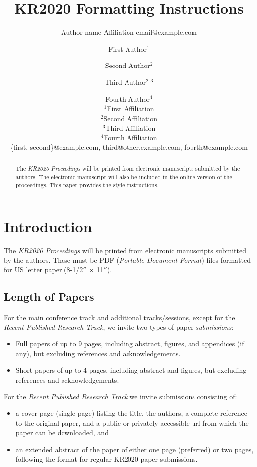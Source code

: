 \documentclass{article}
\title{KR2020 Formatting Instructions}
\author{%
    Author name
    \affiliations
    Affiliation
    \emails
    email@example.com    %
}
\author{%
First Author$^1$\and
Second Author$^2$\and
Third Author$^{2,3}$\and
Fourth Author$^4$ \\
\affiliations
$^1$First Affiliation\\
$^2$Second Affiliation\\
$^3$Third Affiliation\\
$^4$Fourth Affiliation \\
\emails
\{first, second\}@example.com,
third@other.example.com,
fourth@example.com
}
\begin{document}
\maketitle

\begin{abstract}
  The \textit{KR2020 Proceedings} will be printed from electronic
  manuscripts submitted by the authors. The electronic man\-u\-script will
  also be included in the online version of the proceedings. This paper
  provides the style instructions.
\end{abstract}

\section{Introduction}

The \textit{KR2020 Proceedings} will be printed from electronic
manuscripts submitted by the authors. These must be PDF (\emph{Portable
Document Format}) files formatted for US letter paper (8-1/2$''$ $\times$ 11$''$).

\subsection{Length of Papers}

For the main conference track and additional tracks/sessions, except for the
\emph{Recent Published Research Track}, we invite two types of paper
\emph{submissions}:
\begin{itemize}
\item Full papers of up to 9 pages, including abstract, figures, and appendices
  (if any), but excluding references and acknowledgements.
\item Short papers of up to 4 pages, including abstract and figures, but
  excluding references and acknowledgements.
\end{itemize}

For the \emph{Recent Published Research Track} we invite submissions consisting
of:
\begin{itemize}
\item a cover page (single page) listing the title, the authors, a complete
  reference to the original paper, and a public or privately accessible url
  from which the paper can be downloaded, and
\item an extended abstract of the paper of either one page (preferred) or two
  pages, following the format for regular KR2020 paper submissions.
\end{itemize}
\end{document}
